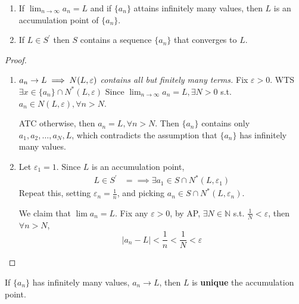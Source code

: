 \begin{proposition}
    \hfill
    \begin{enumerate}
        \item If $\lim_{n \to \infty} a_n = L$ and if $\{ a_n \} $
        attains infinitely many values, then $L$ is an accumulation point of $ \{ a_n \} $.
        \item If $L \in S^{\prime}$ then $S$ contains a sequence 
        $\{ a_n \} $ that converges to $L$.
    \end{enumerate}
\end{proposition}
\begin{proof}
    \begin{enumerate}
        \item \textit{$a_n \to L \implies N(L, \varepsilon)$ contains all but finitely many terms.}
        Fix $\varepsilon > 0$. WTS $\exists x \in \{ a_n \} \cap N^*(L, \varepsilon)$
        Since $\lim_{n \to \infty} a_n = L, \exists N > 0$ 
        s.t. $a_n \in N(L, \varepsilon), \forall n > N$.
        \medskip 

        ATC otherwise, then $a_n = L, \forall n > N$. Then
        $\{ a_n \} $ contains only $a_1, a_2, \hdots, a_N, L$, 
        which contradicts the assumption that $\{ a_n \} $
        has infinitely many values.
        \item Let $\varepsilon_1 = 1$. Since $L$ is an accumulation point,
        \begin{align*}
            L \in S^{\prime} & = \implies \exists a_1 \in S \cap N^*(L, \varepsilon_1)
        \end{align*}
        Repeat this, setting $\varepsilon_n = \frac{1}{n}$, and picking
        $a_n \in S \cap N^*(L, \varepsilon_n)$.
        \medskip 

        We claim that $\lim a_n = L$. Fix any $\varepsilon > 0$,
        by AP, $\exists N \in \mathbb{N}$ s.t. $ \frac{1}{N} < \varepsilon$, 
        then $\forall n > N$, 
        \[
            |a_n - L| < \frac{1}{n} < \frac{1}{N} < \varepsilon
        \]
    \end{enumerate}
\end{proof}

\begin{remark}
    If $ \{ a_n \} $ has infinitely many values, $a_n \to L$, then $L$ is \textbf{unique} the accumulation point. 
\end{remark}









